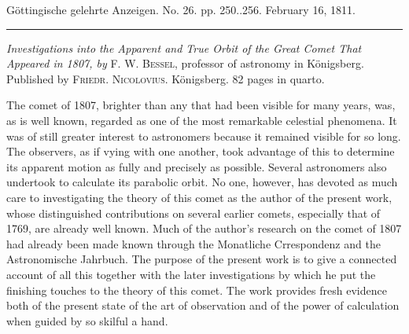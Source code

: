 \hypertarget{native-535lower}{}\label{native-535lower}
\begin{center}\small Göttingische gelehrte Anzeigen. No. 26. pp. 250..256. February 16, 1811.\\[3pt]\rule{.72\linewidth}{.3pt}\end{center}

\emph{Investigations into the Apparent and True Orbit of the Great Comet That Appeared in \textup{1807}, by} F. W. \textsc{Bessel}, professor of astronomy in Königsberg. Published by \textsc{Friedr. Nicolovius}. Königsberg. 82 pages in quarto.

The comet of 1807, brighter than any that had been visible for many years, was, as is well known, regarded as one of the most remarkable celestial phenomena. It was of still greater interest to astronomers because it remained visible for so long. The observers, as if vying with one another, took advantage of this to determine its apparent motion as fully and precisely as possible. Several astronomers also undertook to calculate its parabolic orbit. No one, however, has devoted as much care to investigating the theory of this comet as the author of the present work, whose distinguished contributions on several earlier comets, especially that of 1769, are already well known. Much of the author's research on the comet of 1807 had already been made known through the Monatliche Crrespondenz and the Astronomische Jahrbuch. The purpose of the present work is to give a connected account of all this together with the later investigations by which he put the finishing touches to the theory of this comet. The work provides fresh evidence both of the present state of the art of observation and of the power of calculation when guided by so skilful a hand.

